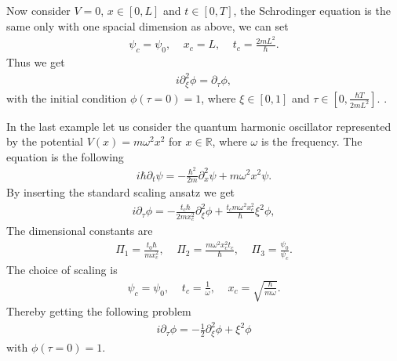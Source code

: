 Now consider $V = 0$, $x\in[0, L]$ and $t \in [0, T]$, the Schrodinger
equation is the same only with one spacial dimension as above, we can set
\begin{align}
    \psi_c = \psi_0, \;\;\;\; x_c =L, \;\;\;\; t_c = \frac{2mL^2}{\hbar}.
\end{align}
Thus we get
\begin{align}
    i\partial_{\xi}^2 \phi = \partial_\tau \phi,
\end{align}
with the initial condition $\phi(\tau=0) = 1$, where $\xi \in [0, 1]$ and
$\tau \in [0, \frac{\hbar T}{2mL^2}]$.
.

In the last example let us consider the quantum harmonic oscillator
represented by the potential $V(x) = m\omega^2 x^2$ for $x\in \mathbb{R}$,
where $\omega$ is the frequency. The equation is the following
\begin{align}
    i \hbar \partial_t \psi = -\frac{\hbar^2}{2m}\partial^2_x \psi
    +m\omega^2x^2 \psi.
\end{align}
By inserting the standard scaling ansatz we get
\begin{align}
    i\partial_\tau \phi = -\frac{t_c\hbar}{2mx_c^2}\partial_\xi^2 \phi
    +\frac{t_cm\omega^2x_c^2}{\hbar} \xi^2 \phi,
\end{align}
The dimensional constants are
\begin{align}
    \Pi_1 = \frac{t_0\hbar}{mx_c^2},\;\;\;\;\Pi_2 =
    \frac{m\omega^2x_c^2t_c}{\hbar},\;\;\;\; \Pi_3 = \frac{\psi_0}{\psi_c}.
\end{align}
The choice of scaling is
\begin{align}
    \psi_c = \psi_0, \;\;\;\; t_c = \frac{1}{\omega}, \;\;\;\; x_c =
    \sqrt{\frac{\hbar}{m\omega}}.
\end{align}
Thereby getting the following problem
\begin{align}
    i\partial_\tau \phi = -\frac{1}{2} \partial_\xi^2 \phi +\xi^2 \phi
\end{align}
with $\phi(\tau = 0) = 1$.


